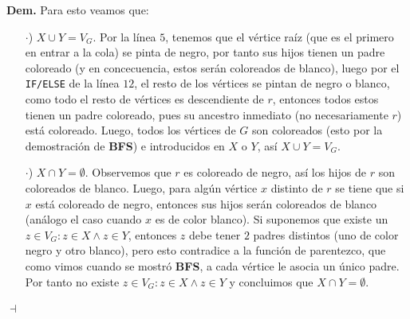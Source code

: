 \documentclass{article}
\newcommand{\code}[1]{\textcolor{white!25!black}{\texttt{#1}}}
\begin{document}
\begin{enumerate}
  \textbf{Dem.}   Para esto veamos que:
  \begin{itemize}
  \item[$\cdot$)] $X\cup Y = V_G$. Por la l\'inea $5$, tenemos que el
    v\'ertice ra\'iz (que es el primero en entrar a la cola) se pinta
    de negro, por tanto sus hijos tienen un padre coloreado (y en concecuencia,
    estos ser\'an coloreados de blanco), luego por el \code{IF/ELSE}
    de la l\'inea $12$, el resto de los v\'ertices se pintan de negro
    o blanco, como todo el resto de v\'ertices es descendiente de $r$,
    entonces todos estos tienen un padre coloreado, pues su ancestro
    inmediato (no necesariamente $r$) est\'a coloreado. Luego, todos
    los v\'ertices de $G$ son coloreados (esto por la demostraci\'on de
    \textbf{BFS}) e introducidos en $X$ o $Y$, as\'i $X\cup Y = V_G$.
    
  \item[$\cdot$)] $X\cap Y = \emptyset$. Observemos que $r$ es coloreado
    de negro, as\'i los hijos de $r$ son coloreados de blanco. Luego,
    para alg\'un v\'ertice $x$ distinto de $r$ se tiene que si $x$ est\'a
    coloreado de negro, entonces sus hijos ser\'an coloreados de blanco
    (an\'alogo el caso cuando $x$ es de color blanco). Si suponemos que
    existe un $z \in V_G : z \in X \land z \in Y$, entonces $z$ debe tener
    $2$ padres distintos (uno de color negro y otro blanco), pero esto
    contradice a la funci\'on de parentezco, que como vimos cuando se
    mostr\'o \textbf{BFS}, a cada v\'ertice le asocia un \'unico padre.
    Por tanto no existe $z \in V_G : z \in X \land z \in Y$ y concluimos
    que $X\cap Y = \emptyset$.
    
  \end{itemize}
  \hfill $\dashv$
\end{enumerate}
\end{document}

